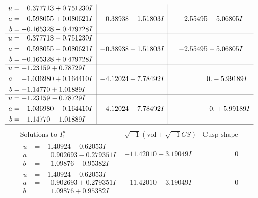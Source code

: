 \documentclass[1p]{elsarticle_modified}
\theoremstyle{definition}
\newcommand{\I}{\sqrt{-1}}
\begin{document}
$$\begin{array}{c|c|c}
\begin{aligned}
u &= \phantom{-}0.377713 + 0.751230 I \\
a &= \phantom{-}0.598055 + 0.080621 I \\
b &= -0.165328 - 0.479728 I\end{aligned}
 & -0.38938 - 1.51803 I & -2.55495 + 5.06805 I \\ \hline\begin{aligned}
u &= \phantom{-}0.377713 - 0.751230 I \\
a &= \phantom{-}0.598055 - 0.080621 I \\
b &= -0.165328 + 0.479728 I\end{aligned}
 & -0.38938 + 1.51803 I & -2.55495 - 5.06805 I \\ \hline\begin{aligned}
u &= -1.23159 + 0.78729 I \\
a &= -1.036980 + 0.164410 I \\
b &= -1.14770 + 1.01889 I\end{aligned}
 & -4.12024 + 7.78492 I & \phantom{-0.000000 } 0. - 5.99189 I \\ \hline\begin{aligned}
u &= -1.23159 - 0.78729 I \\
a &= -1.036980 - 0.164410 I \\
b &= -1.14770 - 1.01889 I\end{aligned}
 & -4.12024 - 7.78492 I & \phantom{-0.000000 -}0. + 5.99189 I\\
 \hline 
 \end{array}$$\newpage$$\begin{array}{c|c|c}  
\text{Solutions to }I^u_{1}& \I (\text{vol} + \sqrt{-1}CS) & \text{Cusp shape}\\
 \hline 
\begin{aligned}
u &= -1.40924 + 0.62053 I \\
a &= \phantom{-}0.902693 - 0.279351 I \\
b &= \phantom{-}1.09876 - 0.95382 I\end{aligned}
 & -11.42010 + 3.19049 I & \phantom{-0.000000 } 0 \\ \hline\begin{aligned}
u &= -1.40924 - 0.62053 I \\
a &= \phantom{-}0.902693 + 0.279351 I \\
b &= \phantom{-}1.09876 + 0.95382 I\end{aligned}
 & -11.42010 - 3.19049 I & \phantom{-0.000000 } 0 \\ \hline\begin{aligned}

\end{aligned}
\end{array}$$
\end{document}
